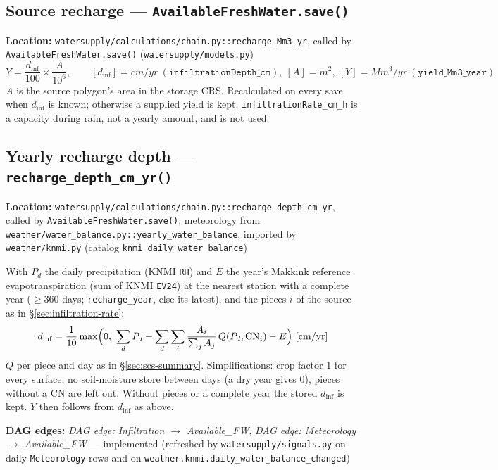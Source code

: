 \documentclass[11pt]{article}
\newcommand{\code}[1]{\texttt{#1}}
\newcommand{\dagedge}[1]{\textit{DAG edge: #1}}
\newcommand{\statusdone}{\textcolor{green!50!black}{implemented}}
\begin{document}
\subsection{Source recharge --- \code{AvailableFreshWater.save()}}
\textbf{Location:} \code{watersupply/calculations/chain.py::recharge\_Mm3\_yr}, called by \code{AvailableFreshWater.save()} (\code{watersupply/models.py})
\begin{equation}
  Y = \frac{d_{\text{inf}}}{100} \times \frac{A}{10^6}, \qquad [d_{\text{inf}}] = \si{cm/yr}\ (\texttt{infiltrationDepth\_cm}),\ [A] = \si{m^2},\ [Y] = \si{Mm^3/yr}\ (\texttt{yield\_Mm3\_year})
\end{equation}
$A$ is the source polygon's area in the storage CRS. Recalculated on every save when $d_{\text{inf}}$ is known; otherwise a supplied yield is kept. \texttt{infiltrationRate\_cm\_h} is a capacity during rain, not a yearly amount, and is not used.

\subsection{Yearly recharge depth --- \code{recharge\_depth\_cm\_yr()}}
\textbf{Location:} \code{watersupply/calculations/chain.py::recharge\_depth\_cm\_yr}, called by \code{AvailableFreshWater.save()}; meteorology from \code{weather/water\_balance.py::yearly\_water\_balance}, imported by \code{weather/knmi.py} (catalog \texttt{knmi\_daily\_water\_balance})

With $P_d$ the daily precipitation (KNMI \texttt{RH}) and $E$ the year's Makkink reference evapotranspiration (sum of KNMI \texttt{EV24}) at the nearest station with a complete year ($\geq 360$ days; \texttt{recharge\_year}, else its latest), and the pieces $i$ of the source as in \S\ref{sec:infiltration-rate}:
\begin{equation}
  d_{\text{inf}} = \frac{1}{10}\max\Bigl(0,\ \sum_d P_d - \sum_d \sum_i \frac{A_i}{\sum_j A_j}\, Q(P_d, \mathrm{CN}_i) - E\Bigr)\ [\si{cm/yr}]
\end{equation}
$Q$ per piece and day as in \S\ref{sec:scs-summary}. Simplifications: crop factor 1 for every surface, no soil-moisture store between days (a dry year gives 0), pieces without a CN are left out. Without pieces or a complete year the stored $d_{\text{inf}}$ is kept. $Y$ then follows from $d_{\text{inf}}$ as above.

\textbf{DAG edges:} \dagedge{Infiltration $\rightarrow$ Available\_FW}, \dagedge{Meteorology $\rightarrow$ Available\_FW} --- \statusdone{} (refreshed by \code{watersupply/signals.py} on daily \code{Meteorology} rows and on \code{weather.knmi.daily\_water\_balance\_changed})
\end{document}
